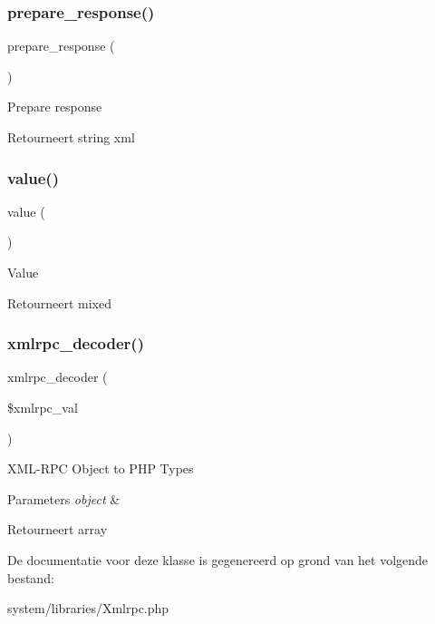 \subsubsection{\texorpdfstring{prepare\_response()}{prepare\_response()}}
{\footnotesize\ttfamily prepare\+\_\+response (\begin{DoxyParamCaption}{ }\end{DoxyParamCaption})}

Prepare response

\begin{DoxyReturn}{Retourneert}
string xml 
\end{DoxyReturn}
\mbox{\label{class_x_m_l___r_p_c___response_aefbfa229f1c9e1fc967bff724a010f9e}} 
\subsubsection{\texorpdfstring{value()}{value()}}
{\footnotesize\ttfamily value (\begin{DoxyParamCaption}{ }\end{DoxyParamCaption})}

Value

\begin{DoxyReturn}{Retourneert}
mixed 
\end{DoxyReturn}
\mbox{\label{class_x_m_l___r_p_c___response_a44f453c58a4aad3ccb76dd9926f9fa64}} 
\subsubsection{\texorpdfstring{xmlrpc\_decoder()}{xmlrpc\_decoder()}}
{\footnotesize\ttfamily xmlrpc\+\_\+decoder (\begin{DoxyParamCaption}\item[{}]{\$xmlrpc\+\_\+val }\end{DoxyParamCaption})}

X\+M\+L-\/\+R\+PC Object to P\+HP Types


\begin{DoxyParams}{Parameters}
{\em object} & \\
\hline
\end{DoxyParams}
\begin{DoxyReturn}{Retourneert}
array 
\end{DoxyReturn}


De documentatie voor deze klasse is gegenereerd op grond van het volgende bestand\+:\begin{DoxyCompactItemize}
\item 
system/libraries/Xmlrpc.\+php\end{DoxyCompactItemize}
